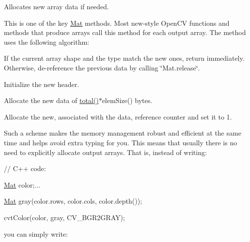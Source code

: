 Allocates new array data if needed.

This is one of the key {\ttfamily \mbox{\hyperlink{classorg_1_1opencv_1_1core_1_1_mat}{Mat}}} methods. Most new-\/style Open\+CV functions and methods that produce arrays call this method for each output array. The method uses the following algorithm\+:


\begin{DoxyItemize}
\item If the current array shape and the type match the new ones, return immediately. Otherwise, de-\/reference the previous data by calling \char`\"{}\+Mat.\+release\char`\"{}. 
\item Initialize the new header. 
\item Allocate the new data of {\ttfamily \mbox{\hyperlink{classorg_1_1opencv_1_1core_1_1_mat_a0aa57e546fe72e994dafe806f47f0081}{total()}}$\ast$elem\+Size()} bytes. 
\item Allocate the new, associated with the data, reference counter and set it to 1. 
\end{DoxyItemize}

Such a scheme makes the memory management robust and efficient at the same time and helps avoid extra typing for you. This means that usually there is no need to explicitly allocate output arrays. That is, instead of writing\+: {\ttfamily }

{\ttfamily }

{\ttfamily }

{\ttfamily // C++ code\+:}

{\ttfamily }

{\ttfamily }

{\ttfamily \mbox{\hyperlink{classorg_1_1opencv_1_1core_1_1_mat}{Mat}} color;...}

{\ttfamily }

{\ttfamily }

{\ttfamily \mbox{\hyperlink{classorg_1_1opencv_1_1core_1_1_mat}{Mat}} gray(color.\+rows, color.\+cols, color.\+depth());}

{\ttfamily }

{\ttfamily }

{\ttfamily cvt\+Color(color, gray, C\+V\+\_\+\+B\+G\+R2\+G\+R\+A\+Y);}

{\ttfamily }

{\ttfamily }

{\ttfamily you can simply write\+:}

{\ttfamily }

{\ttfamily }


